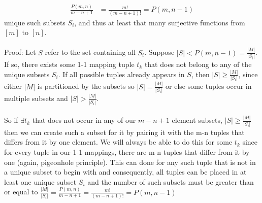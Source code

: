 \documentclass[12pt]{article}
\begin{document}
\begin{enumerate}
\begin{align*}
\frac{P(m, n)}{m-n+1}&=\frac{m!}{(m-n+1)!}=P(m, n-1)
\end{align*}
unique such subsets $S_i$, and thus at least that many surjective functions from
$[m]$ to $[n]$. \\
\\
Proof: Let $S$ refer to the set containing all $S_i$. Suppose $|S| < P(m, n-1) = \frac{|M|}{|S_i|}$. If so, there exists some 1-1 mapping tuple $t_k$ that does not belong to any of the unique subsets $S_i$. If all possible tuples already appears in $S$, then $|S| \geq \frac{|M|}{|S_i|}$, since either $|M|$ is partitioned by the subsets so  $|S| = \frac{|M|}{|S_i|}$ or else some tuples occur in multiple subsets and $|S| > \frac{|M|}{|S_i|}$. \\
\\
So if $\exists t_k$ that does not occur in any of our $m-n+1$ element subsets, $|S| \geq \frac{|M|}{|S_i|}$ then we can create such a subset for it by pairing it with the m-n tuples that differs from it by one element. We will always be able to do this for some $t_k$ since for every tuple in our 1-1 mappings, there are m-n tuples that differ from it by one (again, pigeonhole principle). This can
done for any such tuple that is not in a unique subset to begin with and
consequently, all tuples can be placed in at least one unique subset $S_i$ and the number of such subsets must be greater than or equal to $\frac{|M|}{|S_i|} = \frac{P(m, n)}{m-n+1}=\frac{m!}{(m-n+1)!}=P(m, n-1)$
\\
\\




\end{enumerate}
\end{document}
